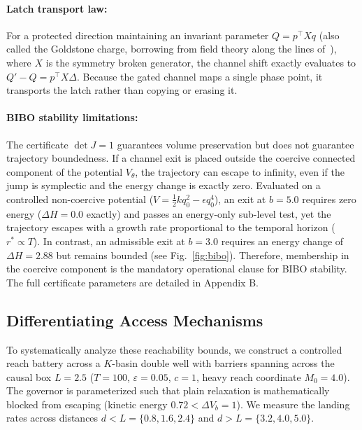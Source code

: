 \documentclass{article}
\newcommand{\half}{\tfrac12}
\newcommand{\detJ}{\det J}
\begin{document}
\paragraph{Latch transport law:}
For a protected direction maintaining an invariant parameter $Q=p^\top X q$ (also called the Goldstone charge, borrowing from field theory along the lines of~\citet{iqbal_spontaneous_2026}), where $X$ is the symmetry broken generator, the channel shift exactly evaluates to $Q'-Q=p^\top X\Delta$. Because the gated channel maps a single phase point, it transports the latch rather than copying or erasing it.

\paragraph{BIBO stability limitations:}
The certificate $\detJ=1$ guarantees volume preservation but does not guarantee trajectory boundedness. If a channel exit is placed outside the coercive connected component of the potential $V_\theta$, the trajectory can escape to infinity, even if the jump is symplectic and the energy change is exactly zero. Evaluated on a controlled non-coercive potential ($V=\half kq_0^2-\epsilon q_0^4$), an exit at $b=5.0$ requires zero energy ($\Delta H=0.0$ exactly) and passes an energy-only sub-level test, yet the trajectory escapes with a growth rate proportional to the temporal horizon ($r^\ast\propto T$). In contrast, an admissible exit at $b=3.0$ requires an energy change of $\Delta H=2.88$ but remains bounded (see Fig.~\ref{fig:bibo}). Therefore, membership in the coercive component is the mandatory operational clause for BIBO stability. The full certificate parameters are detailed in Appendix B.

\subsection{Differentiating Access Mechanisms}
\label{sec:testbed}
To systematically analyze these reachability bounds, we construct a controlled reach battery across a $K$-basin double well with barriers spanning across the causal box $L=2.5$ ($T=100$, $\varepsilon=0.05$, $c=1$, heavy reach coordinate $M_0=4.0$). The governor is parameterized such that plain relaxation is mathematically blocked from escaping (kinetic energy $0.72 < \Delta V_b=1$). We measure the landing rates across distances $d<L=\{0.8,1.6,2.4\}$ and $d>L=\{3.2,4.0,5.0\}$.
\end{document}
